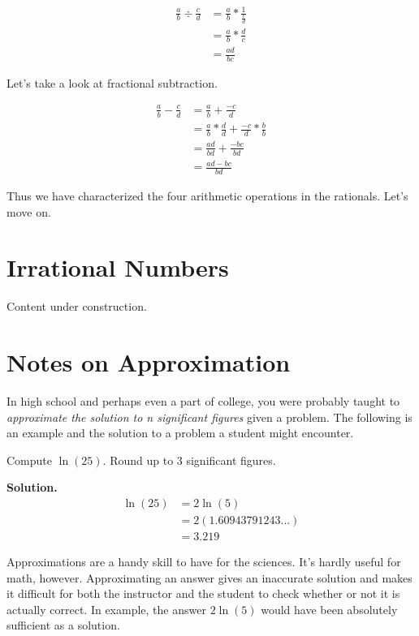 \begin{align*}
    \frac{a}{b} \div \frac{c}{d} &= \frac{a}{b} * \frac{1}{\frac{c}{d}} \\
    &= \frac{a}{b} * \frac{d}{c} \\
    &= \frac{ad}{bc}
\end{align*}

Let's take a look at fractional subtraction. 

\begin{align*}
    \frac{a}{b} - \frac{c}{d} &= \frac{a}{b} + \frac{-c}{d}\\
    &= \frac{a}{b} * \frac{d}{d} + \frac{-c}{d} * \frac{b}{b}\\
    &= \frac{ad}{bd} + \frac{-bc}{bd}\\
    &= \frac{ad - bc}{bd}
\end{align*}

Thus we have characterized the four arithmetic operations in the rationals. Let's move on.

\section{Irrational Numbers}

Content under construction.

\section{Notes on Approximation}

In high school and perhaps even a part of college, you were probably taught to \textit{approximate the solution to n significant figures} given a problem. The following is an example and the solution to a problem a student might encounter.

\begin{example}
Compute $\ln(25)$. Round up to 3 significant figures.
\end{example}
\textbf{Solution.}
\begin{align*}
    \ln(25) &= 2\ln(5)\\
            &= 2(1.60943791243...)\\
            &= 3.219
\end{align*}

Approximations are a handy skill to have for the sciences. It's hardly useful for math, however. Approximating an answer gives an inaccurate solution and makes it difficult for both the instructor and the student to check whether or not it is actually correct. In example, the answer $2\ln(5)$ would have been absolutely sufficient as a solution. 


